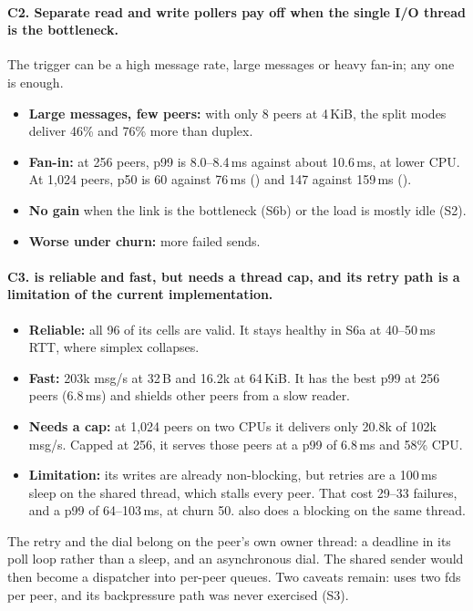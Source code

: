 \paragraph{C2. Separate read and write pollers pay off when the single I/O thread is
the bottleneck.} The trigger can be a high message rate, large messages or heavy
fan-in; any one is enough.
\begin{itemize}
  \item \textbf{Large messages, few peers:} with only 8 peers at 4\,KiB, the split
        modes deliver 46\% and 76\% more than duplex.
  \item \textbf{Fan-in:} at 256 peers, p99 is 8.0--8.4\,ms against about 10.6\,ms, at
        lower CPU. At 1,024 peers, p50 is 60 against 76\,ms () and 147
        against 159\,ms ().
  \item \textbf{No gain} when the link is the bottleneck (S6b) or the load is mostly
        idle (S2).
  \item \textbf{Worse under churn:} more failed sends.
\end{itemize}

\paragraph{C3.  is reliable and fast, but needs a thread cap, and
its retry path is a limitation of the current implementation.}
\begin{itemize}
  \item \textbf{Reliable:} all 96 of its cells are valid. It stays healthy in S6a at
        40--50\,ms RTT, where simplex collapses.
  \item \textbf{Fast:} 203k msg/s at 32\,B and 16.2k at 64\,KiB. It has the best p99
        at 256 peers (6.8\,ms) and shields other peers from a slow reader.
  \item \textbf{Needs a cap:} at 1,024 peers on two CPUs it delivers only 20.8k of
        102k msg/s. Capped at 256, it serves those peers at a p99 of 6.8\,ms and
        58\% CPU.
  \item \textbf{Limitation:} its writes are already non-blocking, but retries are a
        100\,ms sleep on the shared  thread, which stalls every
        peer. That cost 29--33 failures, and a p99 of 64--103\,ms, at churn 50.
         also does a blocking  on the same thread.
\end{itemize}
The retry and the dial belong on the peer's own owner thread: a deadline in its poll
loop rather than a sleep, and an asynchronous dial. The shared sender would then
become a dispatcher into per-peer queues. Two caveats remain: 
uses two fds per peer, and its backpressure path was never exercised (S3).

